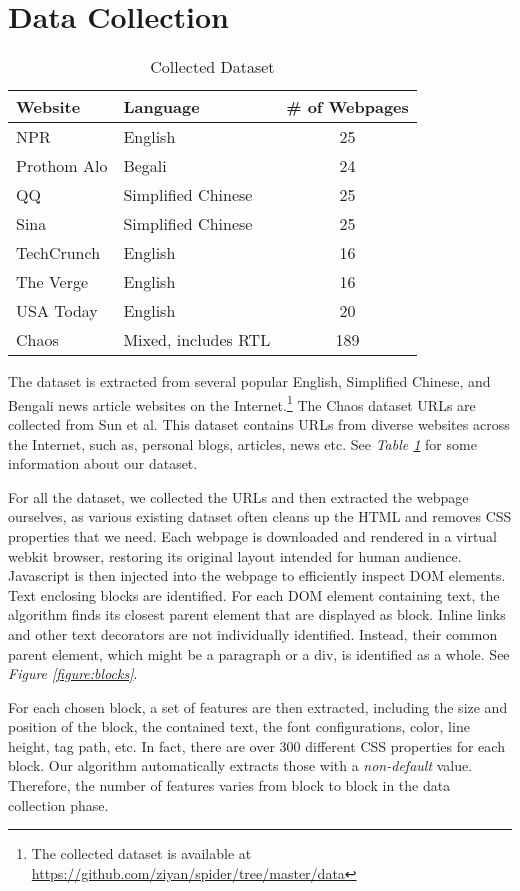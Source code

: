 \documentclass{acm_proc_article-sp}
\begin{document}
\section{Data Collection}

\begin{table}
\centering
\caption{\label{table:dataset}Collected Dataset}
\begin{tabular}{|l|l|c|} \hline
Website&Language&\# of Webpages\\ \hline\hline
NPR&English&25\\ \hline
Prothom Alo&Begali&24\\ \hline
QQ&Simplified Chinese&25\\ \hline
Sina&Simplified Chinese&25\\ \hline
TechCrunch&English&16\\ \hline
The Verge&English&16\\ \hline
USA Today&English&20\\ \hline
Chaos&Mixed, includes RTL&189\\ \hline
\end{tabular}
\end{table}

The dataset is extracted from several popular English, Simplified Chinese, and Bengali news article websites on the Internet.\footnote{The collected dataset is available at \url{https://github.com/ziyan/spider/tree/master/data}} The Chaos dataset URLs are collected from Sun et al.\cite{sun2011dom} This dataset contains URLs from diverse websites across the Internet, such as, personal blogs, articles, news etc. See \emph{Table \ref{table:dataset}} for some information about our dataset.

For all the dataset, we collected the URLs and then extracted the webpage ourselves, as various existing dataset often cleans up the HTML and removes CSS properties that we need. Each webpage is downloaded and rendered in a virtual webkit browser\cite{phantomjs}, restoring its original layout intended for human audience. Javascript is then injected into the webpage to efficiently inspect DOM elements. Text enclosing blocks are identified. For each DOM element containing text, the algorithm finds its closest parent element that are displayed as block. Inline links and other text decorators are not individually identified. Instead, their common parent element, which might be a paragraph or a div, is identified as a whole. See \emph{Figure \ref{figure:blocks}}.

For each chosen block, a set of features are then extracted, including the size and position of the block, the contained text, the font configurations, color, line height, tag path, etc. In fact, there are over 300 different CSS properties for each block. Our algorithm automatically extracts those with a \emph{non-default} value. Therefore, the number of features varies from block to block in the data collection phase.
\end{document}
